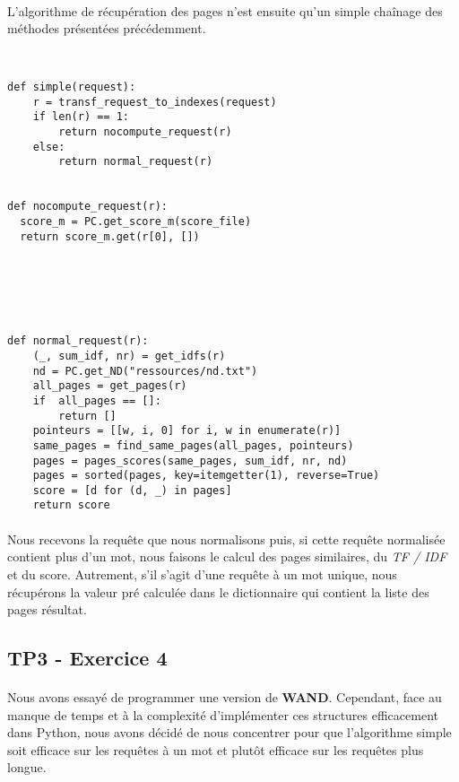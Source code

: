 \documentclass[10pt,a4paper]{article}
\begin{document}
\paragraph{}L'algorithme de récupération des pages n'est ensuite qu'un simple chaînage des méthodes présentées précédemment.
\begin{verbatim}


def simple(request):
    r = transf_request_to_indexes(request)
    if len(r) == 1:
        return nocompute_request(r)
    else:
        return normal_request(r)


def nocompute_request(r):
  score_m = PC.get_score_m(score_file)
  return score_m.get(r[0], [])






def normal_request(r):
    (_, sum_idf, nr) = get_idfs(r)
    nd = PC.get_ND("ressources/nd.txt")
    all_pages = get_pages(r)
    if  all_pages == []:
        return []
    pointeurs = [[w, i, 0] for i, w in enumerate(r)]
    same_pages = find_same_pages(all_pages, pointeurs)
    pages = pages_scores(same_pages, sum_idf, nr, nd)
    pages = sorted(pages, key=itemgetter(1), reverse=True)
    score = [d for (d, _) in pages]
    return score
\end{verbatim}

\paragraph{}Nous recevons la requête que nous normalisons puis, si cette requête normalisée contient plus d'un mot, nous faisons le calcul des pages similaires, du \textit{TF / IDF} et du score. Autrement, s'il s'agit d'une requête à un mot unique, nous récupérons la valeur pré calculée dans le dictionnaire qui contient la liste des pages résultat. 

\subsection{TP3 - Exercice 4}
\paragraph{}Nous avons essayé de programmer une version de \textbf{WAND}. Cependant, face au manque de temps et à la complexité d'implémenter ces structures efficacement dans Python, nous avons décidé de nous concentrer pour que l'algorithme simple soit efficace sur les requêtes à un mot et plutôt efficace sur les requêtes plus longue.
\end{document}
